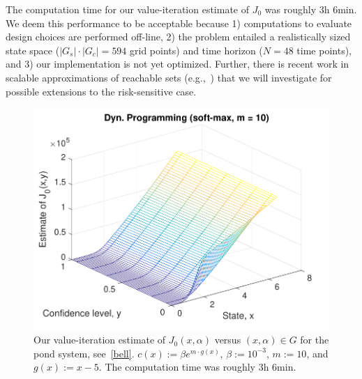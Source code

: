 \documentclass[letterpaper, 10 pt, conference]{ieeeconf}  %
\begin{document}
The computation time for our value-iteration estimate of $J_0$ was roughly 3h 6min.
We deem this performance to be acceptable because  
1) computations to evaluate design choices are performed off-line, 
2) the problem entailed a realistically sized state space ($|G_s|\cdot|G_c| = 594$ grid points) and time horizon ($N = 48$ time points),
and 3) our implementation is not yet optimized. Further, there is recent work in scalable approximations of reachable sets (e.g.,~\cite{EECS-2018-41}) that we will investigate for possible extensions to the risk-sensitive case.
\begin{figure}[thpb]
      \centering
      \includegraphics[scale=0.5]{dyn_prog_J0_sept112018.pdf}
      \vspace{-1em}
      \caption{Our value-iteration estimate of $J_0(x,\alpha)$ versus $(x, \alpha) \in G$ for the pond system, see~\eqref{bell}.
	  $c(x) := \beta e^{m\cdot g(x)}$, $\beta := 10^{-3}$, $m := 10$, and $g(x) := x-5$. The computation time was roughly 3h 6min.}
      \label{J0dp}
\end{figure}
\end{document}
